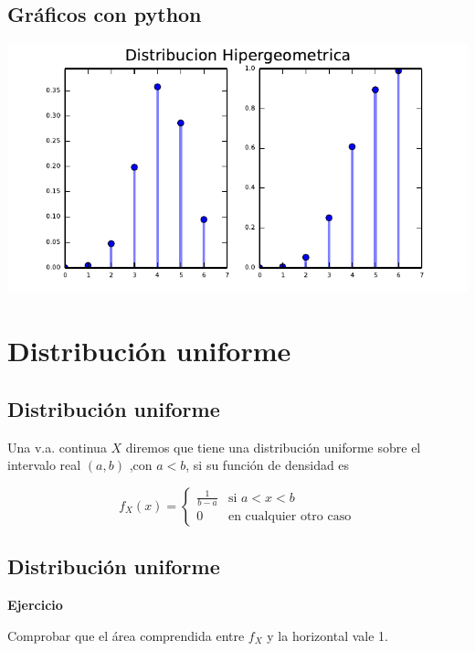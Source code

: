 \documentclass[]{book}
\begin{document}
\hypertarget{gruxe1ficos-con-python-5}{%
\subsection{Gráficos con python}\label{gruxe1ficos-con-python-5}}

\includegraphics{curso-probabilidad-udemy_files/figure-latex/py_hyper2-1.pdf}

\hypertarget{distribuciuxf3n-uniforme}{%
\section{Distribución uniforme}\label{distribuciuxf3n-uniforme}}

\hypertarget{distribuciuxf3n-uniforme-1}{%
\subsection{Distribución uniforme}\label{distribuciuxf3n-uniforme-1}}

Una v.a. continua \(X\) diremos que tiene una distribución uniforme sobre el intervalo real \((a,b)\) ,con \(a<b\), si su función de densidad es

\[
f_X(x)=\left\{\begin{array}{ll}
\frac1{b-a} & \mbox{si } a<x<b\\ 0  & \mbox{en cualquier otro caso}
\end{array}
\right. 
\]

\hypertarget{distribuciuxf3n-uniforme-2}{%
\subsection{Distribución uniforme}\label{distribuciuxf3n-uniforme-2}}

\textbf{Ejercicio}

Comprobar que el área comprendida entre \(f_X\) y la horizontal
vale 1.
\end{document}
